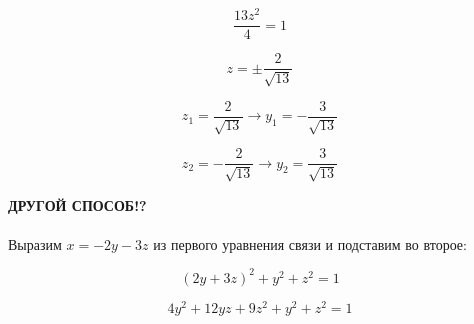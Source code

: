 \documentclass[a5paper, 10pt]{article}
\theoremstyle{definition}
\theoremstyle{plain}
\theoremstyle{remark}
\begin{document}
\begin{equation}
\frac{13z^2}{4} = 1
\end{equation}

\begin{equation}
z = \pm \frac{2}{\sqrt{13}}
\end{equation}

\begin{equation}
z_1 = \frac{2}{\sqrt{13}} \to y_1 = -\frac{3}{\sqrt{13}}
\end{equation}

\begin{equation}
z_2 = -\frac{2}{\sqrt{13}} \to y_2 = \frac{3}{\sqrt{13}}
\end{equation}

\textbf{ДРУГОЙ СПОСОБ!?}\\
\\
Выразим $x = -2y-3z$ из первого уравнения связи и подставим во второе:

\begin{equation}
  (2y+3z)^2 +y^2+z^2=1
\end{equation}

\begin{equation}
  4y^2+12yz+9z^2 +y^2+z^2=1
\end{equation}
\end{document}
